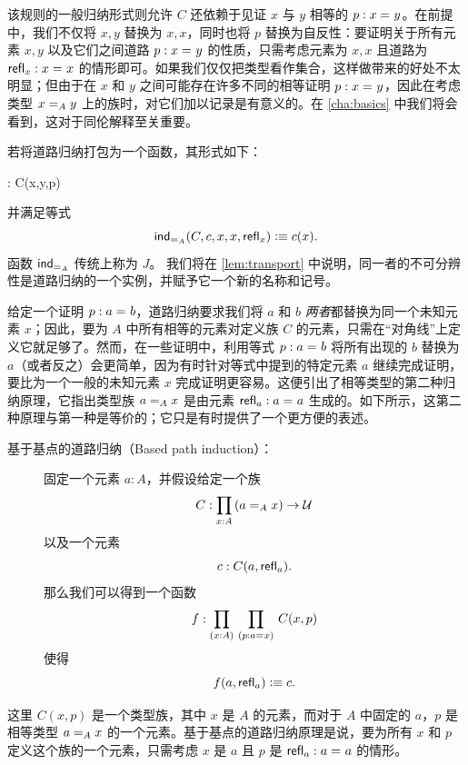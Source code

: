 该规则的一般归纳形式则允许 $C$ 还依赖于见证 $x$ 与 $y$ 相等的 $p:\id{x}{y}$。在前提中，我们不仅将 $x, y$ 替换为 $x, x$，同时也将 $p$ 替换为自反性：要证明关于所有元素 $x, y$ 以及它们之间道路 $p : \id{x}{y}$ 的性质，只需考虑元素为 $x,x$ 且道路为 $\refl{x}: \id{x}{x}$ 的情形即可。如果我们仅仅把类型看作集合，这样做带来的好处不太明显；但由于在 $x$ 和 $y$ 之间可能存在许多不同的相等证明 $p : \id{x}{y}$，因此在考虑类型 $\id[A]{x}{y}$ 上的族时，对它们加以记录是有意义的。在 \cref{cha:basics} 中我们将会看到，这对于同伦解释至关重要。

若将道路归纳打包为一个函数，其形式如下：
%
\begin{narrowmultline*}
   :  
   \to 
  \narrowbreak
     C(x,y,p)
\end{narrowmultline*}
并满足等式
\[ \indid{A}(C,c,x,x,\refl{x}) \defeq c(x). \]
函数 $ \indid{A}$ 传统上称为 $J$。
我们将在 \cref{lem:transport} 中说明，同一者的不可分辨性是道路归纳的一个实例，并赋予它一个新的名称和记号。

\mentalpause

给定一个证明 $p : \id{a}{b}$，道路归纳要求我们将 $a$ 和 $b$ \emph{两者}都替换为同一个未知元素 $x$；因此，要为 $A$ 中所有相等的元素对定义族 $C$ 的元素，只需在``对角线''上定义它就足够了。然而，在一些证明中，利用等式 $p : \id{a}{b}$ 将所有出现的 $b$ 替换为 $a$（或者反之）会更简单，因为有时针对等式中提到的特定元素 $a$ 继续完成证明，要比为一个一般的未知元素 $x$ 完成证明更容易。这便引出了相等类型的第二种归纳原理，它指出类型族 $\id[A]{a}{x}$ 是由元素 $\refl{a} : \id{a}{a}$ 生成的。如下所示，这第二种原理与第一种是等价的；它只是有时提供了一个更方便的表述。

%
%

\begin{description}
\item[基于基点的道路归纳（Based path induction）：] 
  固定一个元素 $a:A$，并假设给定一个族
  \[ C : \prd{x:A} (\id[A]{a}{x}) \to \UU \]
  以及一个元素
  \[ c : C(a,\refl{a}). \]
  那么我们可以得到一个函数
  \[ f : \prd{x:A}{p:\id{a}{x}} C(x,p) \]
  使得
  \[ f(a,\refl{a}) \defeq c.\]
\end{description}

这里 $C(x,p)$ 是一个类型族，其中 $x$ 是 $A$ 的元素，而对于 $A$ 中固定的 $a$，$p$ 是相等类型 $\id[A]{a}{x}$ 的一个元素。基于基点的道路归纳原理是说，要为所有 $x$ 和 $p$ 定义这个族的一个元素，只需考虑 $x$ 是 $a$ 且 $p$ 是 $\refl{a} : \id{a}{a}$ 的情形。

